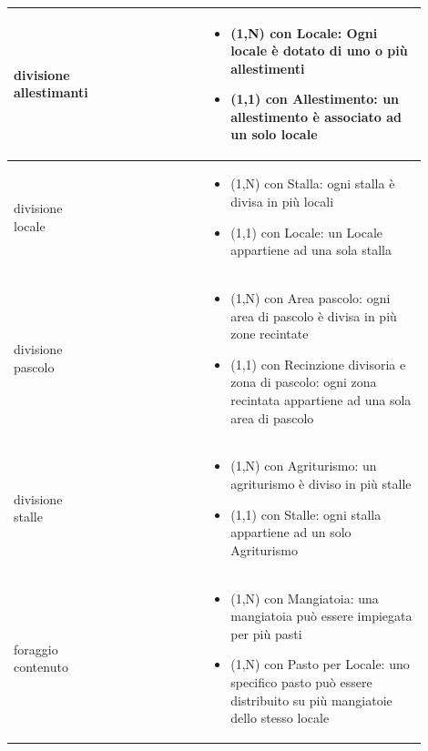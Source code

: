 \documentclass[12pt,a4paper]{article}
\begin{document}
\begin{center}
\begin{longtable}{|p{0.16\linewidth}|p{0.24\linewidth}|p{0.50\linewidth}|}
\hline
divisione allestimanti 				&   
					& \begin{itemize}
						\setlength{\itemindent}{-1em}
						\vspace{-25pt}
						\setlength\itemsep{-0.25em}
						\item (1,N) con Locale: Ogni locale è dotato di uno o più allestimenti
						\item (1,1) con Allestimento: un allestimento è associato ad un solo locale
					\end{itemize}\\ 

\hline
divisione locale 				&   
					& \begin{itemize}
						\setlength{\itemindent}{-1em}
						\vspace{-25pt}
						\setlength\itemsep{-0.25em}
						\item (1,N) con Stalla: ogni stalla è divisa in più locali
						\item (1,1) con Locale: un Locale appartiene ad una sola stalla
					\end{itemize}\\ 

\hline
divisione pascolo 				&   
					& \begin{itemize}
						\setlength{\itemindent}{-1em}
						\vspace{-25pt}
						\setlength\itemsep{-0.25em}
						\item (1,N) con Area pascolo: ogni area di pascolo è divisa in più zone recintate
						\item (1,1) con Recinzione divisoria e zona di pascolo: ogni zona recintata appartiene ad una sola area di pascolo
					\end{itemize}\\ 

\hline
divisione stalle 				&   
					& \begin{itemize}
						\setlength{\itemindent}{-1em}
						\vspace{-25pt}
						\setlength\itemsep{-0.25em}
						\item (1,N) con Agriturismo: un agriturismo è diviso in più stalle
						\item (1,1) con Stalle: ogni stalla appartiene ad un solo Agriturismo
					\end{itemize}\\ 

\hline
foraggio contenuto 				&   
					& \begin{itemize}
						\setlength{\itemindent}{-1em}
						\vspace{-25pt}
						\setlength\itemsep{-0.25em}
						\item (1,N) con Mangiatoia: una mangiatoia può essere impiegata per più pasti
						\item (1,N) con Pasto per Locale: uno specifico pasto può essere distribuito su più mangiatoie dello stesso locale
					\end{itemize}\\ 


\end{longtable}
\end{center}
\end{document}
